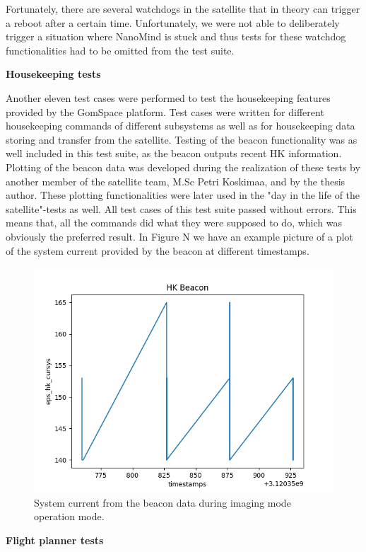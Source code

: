 \documentclass[english,12pt,a4paper,pdftex,elec,utf8]{aaltothesis}
\begin{document}
Fortunately, there are several watchdogs in the satellite that in theory can trigger a reboot after a certain time. Unfortunately, we were not able to deliberately trigger a situation where NanoMind is stuck and thus tests for these watchdog functionalities had to be omitted from the test suite.\par 
\textbf{Housekeeping tests}
\par 
Another eleven test cases were performed to test the housekeeping features provided by the GomSpace platform. Test cases were written for different housekeeping commands of different subsystems as well as for housekeeping data storing and transfer from the satellite. Testing of the beacon functionality was as well included in this test suite, as the beacon outputs recent HK information. Plotting of the beacon data was developed during the realization of these tests by another member of the satellite team, M.Sc Petri Koskimaa, and by the thesis author. These plotting functionalities were later used in the "day in the life of the satellite"-tests as well. All test cases of this test suite passed without errors. This means that, all the commands did what they were supposed to do, which was obviously the preferred result. In Figure N we have an example picture of a plot of the system current provided by the beacon at different timestamps.\par 
\begin{figure}[h!]
\centering
\includegraphics[scale=0.6]{hk_plot_cam_op2}
\caption{System current from the beacon data during imaging mode operation mode.}
\end{figure}
\textbf{Flight planner tests}
\end{document}
